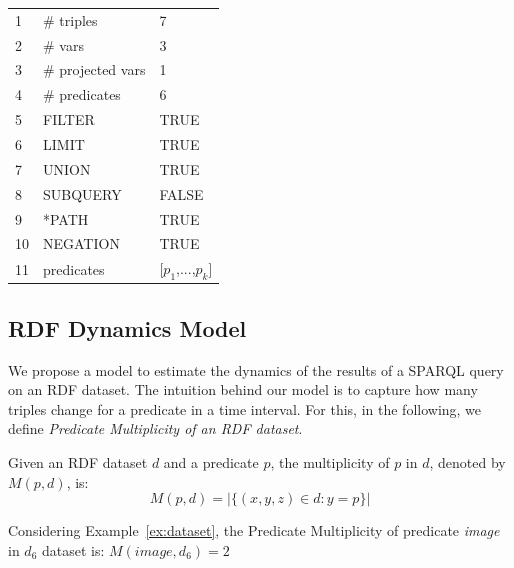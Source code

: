 \documentclass[runningheads]{llncs}
\begin{document}
\begin{center}
	\begin{tabular}{|l|ll|}    \hline
		1  & \# triples        & 7                             \\
		2  & \# vars           & 3                             \\
		3  & \# projected vars & 1                             \\
		4  & \# predicates     & 6                             \\
		5  & FILTER            & TRUE                          \\
		6  & LIMIT             & TRUE                          \\
		7  & UNION             & TRUE                          \\
		8  & SUBQUERY          & FALSE                         \\
		9  & *PATH             & TRUE                          \\
		10 & NEGATION          & TRUE                          \\
		11 & predicates        & {[}$p_1$,...,$p_k${]}    \\    \hline
	\end{tabular}
\end{center}



\subsection{RDF Dynamics Model}

We propose a model to estimate the dynamics of the results of a SPARQL query on an RDF dataset. The intuition behind our model is to capture how many triples change for a predicate in a time interval. For this, in the following, we define \textit{Predicate Multiplicity of an RDF dataset}.

\begin{definition}
	Given an RDF dataset $d$ and a predicate $p$, the multiplicity of $p$ in $d$, denoted by $M(p,d)$, is:
	\begin{equation}
	\label{eq:pm}
	M(p,d) = |\{(x,y,z) \in d : y = p \}|
	\end{equation}
\end{definition}


\begin{example}
	\label{ex:pm}    
	Considering Example~\ref{ex:dataset}, the Predicate Multiplicity of predicate \textit{image} in $d_6$ dataset is:    $M(image,d_6) = 2$
\end{example}
\end{document}

